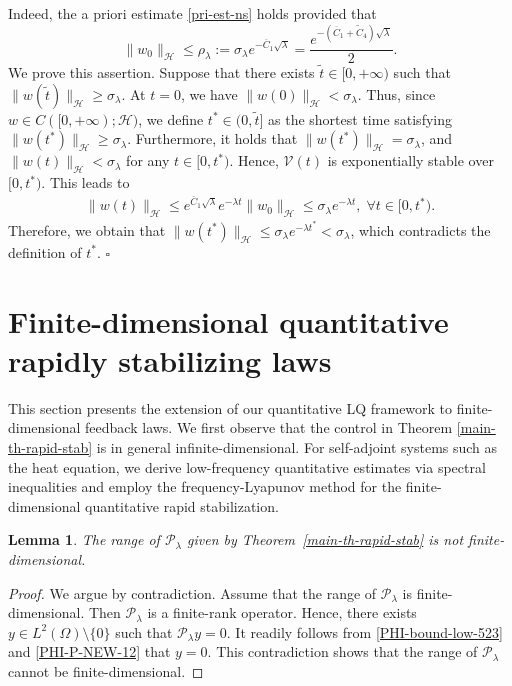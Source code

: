 \documentclass[a4paper]{article}
\newtheorem{lemma}[theorem]{Lemma}
\numberwithin{equation}{section}
\begin{document}
Indeed, the a priori estimate \eqref{pri-est-ns} holds provided that 
$$\|w_0\|_{\mathcal H}\le \rho_\lambda:={\sigma_\lambda}e^{-\overline{C}_1\sqrt{\lambda}}=\frac{e^{-(\overline{C}_1+\widetilde C_4)\sqrt{\lambda}}}{2}.$$
We prove this assertion. Suppose that there exists $\tilde{t}\in [0,+\infty)$ such that $\|w(\tilde{t})\|_{\mathcal H}\ge \sigma_\lambda$. At $t=0$, we have $ \|w(0)\|_{\mathcal H}< {\sigma_\lambda}$. Thus, since $w\in C([0,+\infty);\mathcal H)$, we define $t^*\in(0,\tilde{t}]$ as the shortest time satisfying $\|w(t^*)\|_{\mathcal H}\ge \sigma_\lambda.$ Furthermore, it holds that $ \|w(t^*)\|_{\mathcal H}={\sigma_\lambda}$, and $\|w(t)\|_{\mathcal{H}}<{\sigma}_\lambda$ for any $t\in [0,t^*)$. 
Hence, $\mathcal V(t)$ is exponentially stable over $[0,{t}^*)$.
This leads to
\begin{equation*}
\begin{aligned}
\|w(t)\|_{\mathcal H}\le e^{\overline{C}_1\sqrt{\lambda}}e^{{-\lambda t}} \|w_0\|_{\mathcal H}\le \sigma_\lambda e^{{-\lambda t}}, \;\forall t\in [0,{t}^*).
\end{aligned}
\end{equation*}
Therefore, we obtain that $\|w(t^*)\|_{\mathcal H}\le \sigma_\lambda e^{{-\lambda t^*}}<\sigma_\lambda$, which contradicts the definition of $t^*$. \hfill$\square$



\section{Finite-dimensional quantitative rapidly stabilizing laws}\label{QRS-FINITE}
This section presents the extension of our quantitative LQ framework to finite-dimensional feedback laws. We first observe that the control in Theorem \ref{main-th-rapid-stab} is in general infinite-dimensional. For self-adjoint systems such as the heat equation, we derive low-frequency quantitative estimates via spectral inequalities and employ the frequency-Lyapunov method for the finite-dimensional quantitative rapid stabilization.

\begin{lemma}\label{notfin}
The range of $\mathcal P_\lambda $ given by Theorem~\ref{main-th-rapid-stab} is not finite-dimensional.
\end{lemma}

\begin{proof} We argue by contradiction. Assume that the range of $\mathcal P_\lambda$ is finite-dimensional. Then $\mathcal P_\lambda$ is a finite-rank operator. Hence, there exists $y\in L^2(\Omega)\setminus \{0\}$ such that $\mathcal P_\lambda y=0$. It readily follows from \eqref{PHI-bound-low-523} and \eqref{PHI-P-NEW-12} that $y=0$. This contradiction shows that the range of $\mathcal P_\lambda $ cannot be finite-dimensional.
\end{proof}
\end{document}
